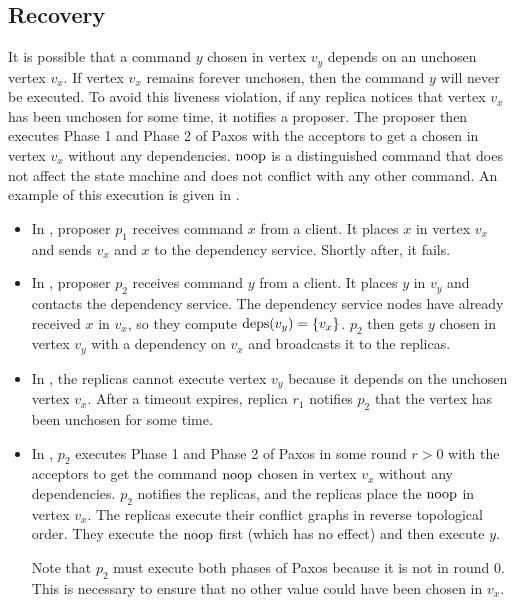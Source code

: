 \subsection{Recovery}
{}

It is possible that a command $y$ chosen in vertex $v_y$ depends on an unchosen
vertex $v_x$. If vertex $v_x$ remains forever unchosen, then the command $y$
will never be executed. To avoid this liveness violation, if any replica
notices that vertex $v_x$ has been unchosen for some time, it notifies a
proposer. The proposer then executes Phase 1 and Phase 2 of Paxos with the
acceptors to get a  chosen in vertex $v_x$ without any
dependencies. $\text{noop}$ is a distinguished command that does not affect the state
machine and does not conflict with any other command. An example of this
execution is given in .

\begin{itemize}
  \item
    In , proposer $p_1$ receives command $x$ from
    a client. It places $x$ in vertex $v_x$ and sends $v_x$ and $x$ to the
    dependency service. Shortly after, it fails.

  \item
    In , proposer $p_2$ receives command
    $y$ from a client. It places $y$ in $v_y$ and contacts the dependency
    service. The dependency service nodes have already received $x$ in $v_x$,
    so they compute $\text{deps}(v_y) = \{v_x\}$. $p_2$ then gets $y$ chosen in
    vertex $v_y$ with a dependency on $v_x$ and broadcasts it to the replicas.

  \item
    In , the replicas cannot execute
    vertex $v_y$ because it depends on the unchosen vertex $v_x$. After a
    timeout expires, replica $r_1$ notifies $p_2$ that the vertex has been
    unchosen for some time.

  \item
    In , $p_2$ executes Phase 1 and Phase
    2 of Paxos in some round $r > 0$ with the acceptors to get the command
    $\text{noop}$ chosen in vertex $v_x$ without any dependencies. $p_2$ notifies the
    replicas, and the replicas place the $\text{noop}$ in vertex $v_x$. The replicas
    execute their conflict graphs in reverse topological order. They execute
    the $\text{noop}$ first (which has no effect) and then execute $y$.

    Note that $p_2$ must execute both phases of Paxos because it is not in
    round $0$. This is necessary to ensure that no other value could have been
    chosen in $v_x$.
\end{itemize}

